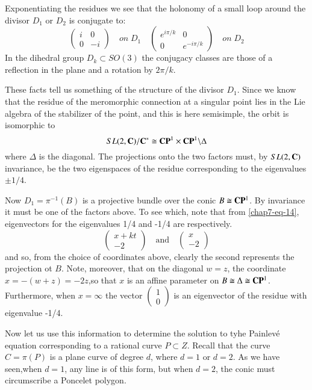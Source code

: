\begin{remark*}
Exponentiating the residues we see that the holonomy of a small loop around the divisor $D_{1}$ or $D_{2}$ is conjugate to:
$$
\left(
\begin{matrix}
i  & 0\\
0 & -i
\end{matrix}
\right)
\quad on \; D_{1} \quad
\left(
\begin{matrix}
e^{i\pi /k}  & 0\\
0 & e^{-i\pi/k}
\end{matrix}
\right)
\quad on \; D_{2}
$$
In the dihedral group $D_{k} \subset SO(3)$ the conjugacy classes are those of a reflection in the plane and a rotation by $2\pi/k$.

These facts tell us something of the structure of the divisor $D_{1}$. Since we know that the residue of the meromorphic connection at a singular point lies in the Lie algebra of the stabilizer of the point, and this is here semisimple,
 the orbit is isomorphic to
 $$
 SL(2, \mathbf{C})/\mathbf{C}^{*} \cong \mathbf{C}\mathbf{P}^{1} \times \mathbf{C}\mathbf{P}^{1}\backslash \Delta
 $$
 where $\Delta$ is the diagonal. The projections onto the two factors must, by $SL(2, \mathbf{C})$ invariance, be the two eigenspaces of the residue corresponding to the eigenvalues $\pm1/4$.

 Now $D_{1}= \pi^{-1}(B)$ is a projective bundle over the conic $B\cong \mathbf{C}\mathbf{P}^{1}$. By invariance it must be one of the factors above. To see which, note that from \eqref{chap7-eq-14}, eigenvectors for the eigenvalues 1/4 and -1/4 are respectively.
 $$
 \left(
 \begin{matrix}
x+kt\\
-2
 \end{matrix}
\right)
\quad \text{and}\quad
\left(
 \begin{matrix}
x\\
-2
 \end{matrix}
\right)
$$
and so, from the choice of coordinates above, clearly the second represents the projection ot $B$. Note, moreover, that on the diagonal $w=z$, the coordinate $x=-(w+z)=-2z$,\pageoriginale so that $x$ is an affine parameter on $B\cong \Delta \cong \mathbf{C}\mathbf{P}^{1}$. Furthermore, when $x=\infty$ the vector
$
\left(
\begin{matrix}
1\\
0
\end{matrix}
\right)
$
is an eigenvector of the residue with eigenvalue -1/4.

Now let us use this information to determine the solution to tyhe Painlev\'e equation corresponding to a rational curve $P\subset Z$. Recall that the curve $C=\pi(P)$ is a plane curve of degree $d$, where $d=1$ or $d=2$. As we have seen,when $d=1$, any line is of this form, but when $d=2$, the conic must circumscribe a Poncelet polygon.


\end{remark*}
